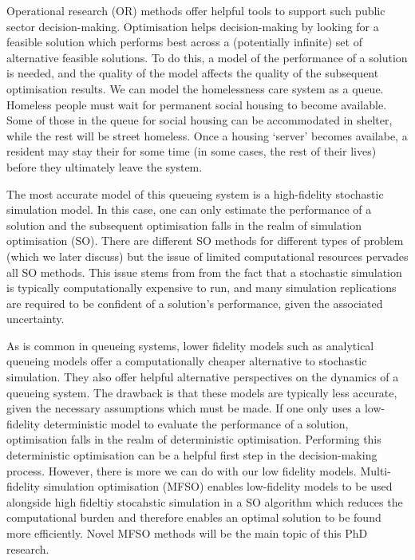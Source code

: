 \documentclass{article}
\begin{document}
Operational research (OR) methods offer helpful tools to support such public sector decision-making. Optimisation helps decision-making by looking for a feasible solution which performs best across a (potentially infinite) set of alternative feasible solutions. To do this, a model of the performance of a solution is needed, and the quality of the model affects the quality of the subsequent optimisation results. We can model the homelessness care system as a queue. Homeless people must wait for permanent social housing to become available. Some of those in the queue for social housing can be accommodated in shelter, while the rest will be street homeless. Once a housing `server' becomes availabe, a resident may stay their for some time (in some cases, the rest of their lives) before they ultimately leave the system. \newline

The most accurate model of this queueing system is a high-fidelity stochastic simulation model. In this case, one can only estimate the performance of a solution and the subsequent optimisation falls in the realm of simulation optimisation (SO). There are different SO methods for different types of problem (which we later discuss) but the issue of limited computational resources pervades all SO methods. This issue stems from from the fact that a stochastic simulation is typically computationally expensive to run, and many simulation replications are required to be confident of a solution's performance, given the associated uncertainty. \newline

As is common in queueing systems, lower fidelity models such as analytical queueing models offer a computationally cheaper alternative to stochastic simulation. They also offer helpful alternative perspectives on the dynamics of a queueing system. The drawback is that these models are typically less accurate, given the necessary assumptions which must be made. If one only uses a low-fidelity deterministic model to evaluate the performance of a solution, optimisation falls in the realm of deterministic optimisation. Performing this deterministic optimisation can be a helpful first step in the decision-making process. However, there is more we can do with our low fidelity models. Multi-fidelity simulation optimisation (MFSO) enables low-fidelity models to be used alongside high fideltiy stocahstic simulation in a SO algorithm which reduces the computational burden and therefore enables an optimal solution to be found more efficiently. Novel MFSO methods will be the main topic of this PhD research. \newline
\end{document}
